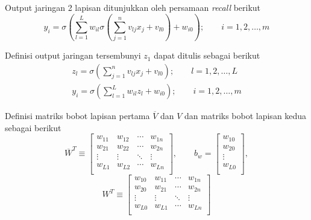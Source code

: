 \noindent Output jaringan 2 lapisan ditunjukkan oleh persamaan \textit{recall} berikut
\begin{equation} \label{eq:3:2layerOut}
y_i = \sigma
\left(
\sum_{l=1}^{L}w_{il}\sigma
	\left(
		\sum_{j=1}^{n}v_{lj}x_j + v_{l0}
	\right)
	+ w_{i0}
\right); \qquad i = 1,2,\dots,m
\end{equation}
\vspace{1em}

\noindent Definisi output jaringan tersembunyi $z_1$ dapat ditulis sebagai berikut
\begin{equation} \label{eq:3:hiddenlayer}
\begin{split}
z_l = \sigma\left(\sum_{j=1}^{n}v_{lj}x_j+v_{l0} \right);\qquad l = 1,2,\dots,L\\
y_i = \sigma\left(\sum_{l=1}^{L}w_{il}z_l+w_{i0} \right);\qquad i = 1,2,\dots,m
\end{split}
\end{equation}
\vspace{1em}

\noindent Definisi matriks bobot lapisan pertama $\overline{V}$ dan $V$ dan matriks bobot lapisan kedua sebagai berikut
\begin{equation} \label{eq:3:weight21Vector}
\overline{W}^T \equiv
\left[
\begin{matrix}
w_{11} & w_{12} & \cdots & w_{1n} \\
w_{21} & w_{22} & \cdots & w_{2n} \\
\vdots & \vdots & \ddots & \vdots \\
w_{L1} & w_{L2} & \cdots & w_{Ln} \\
\end{matrix}
\right], \qquad
b_w = 
\left[
\begin{matrix}
w_{10} \\
w_{20} \\
\vdots \\
w_{L0} \\
\end{matrix}
\right],
\end{equation}
\begin{equation} \label{eq:3:weight22Vector}
W^T \equiv
\left[
\begin{matrix}
w_{10} & w_{11} & \cdots & w_{1n} \\
w_{20} & w_{21} & \cdots & w_{2n} \\
\vdots & \vdots & \ddots & \vdots \\
w_{L0} & w_{L1} & \cdots & w_{Ln} \\
\end{matrix}
\right]
\end{equation}

